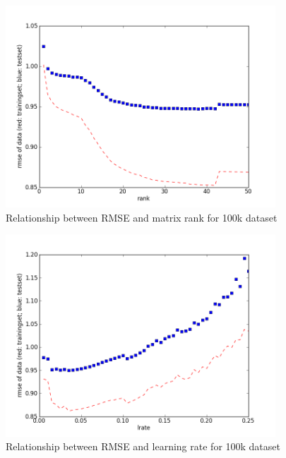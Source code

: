 \documentclass[12pt]{article}
\begin{document}
\begin{figure}[H]
\centering
\includegraphics[width=0.90\textwidth]{smallrmserank.png}
\caption{Relationship between RMSE and matrix rank for 100k dataset}
\end{figure}

\begin{figure}[H]
\centering
\includegraphics[width=0.90\textwidth]{smallrmselr.png}
\caption{Relationship between RMSE and learning rate for 100k dataset}
\end{figure}
\end{document}
